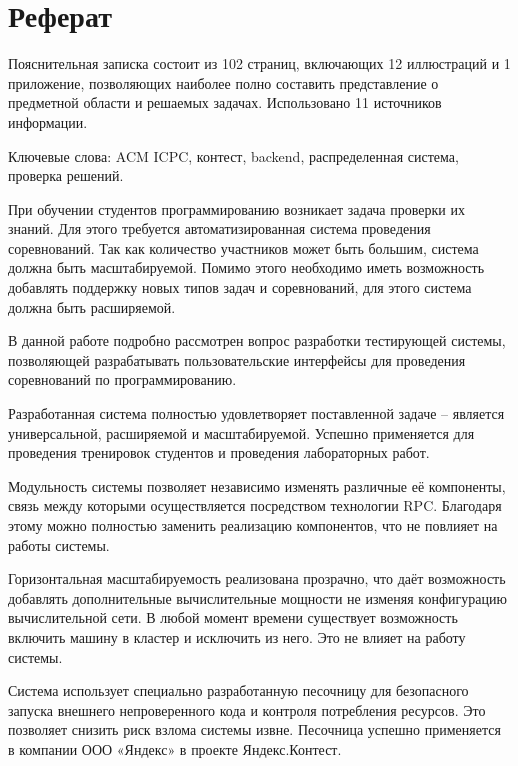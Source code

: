 \chapter*{Реферат}
Пояснительная записка состоит из
102 страниц, включающих 12 иллюстраций и 1 приложение,
позволяющих наиболее полно составить представление о предметной области и решаемых задачах.
Использовано 11 источников информации.

Ключевые слова: ACM ICPC, контест, backend, распределенная система, проверка решений.

При обучении студентов программированию возникает задача
проверки их знаний. Для этого требуется автоматизированная система
проведения соревнований. Так как количество участников
может быть большим, система должна быть масштабируемой.
Помимо этого необходимо иметь возможность добавлять поддержку
новых типов задач и соревнований, для этого
система должна быть расширяемой.


В данной работе подробно рассмотрен вопрос разработки тестирующей системы,
позволяющей разрабатывать пользовательские интерфейсы
для проведения соревнований по программированию.

Разработанная система полностью удовлетворяет поставленной задаче --
является универсальной, расширяемой и масштабируемой.
Успешно применяется для проведения тренировок студентов
и проведения лабораторных работ.

Модульность системы позволяет независимо изменять различные её компоненты,
связь между которыми осуществляется посредством технологии RPC.
Благодаря этому можно полностью заменить реализацию компонентов,
что не повлияет на работы системы.

Горизонтальная масштабируемость реализована прозрачно,
что даёт возможность добавлять дополнительные
вычислительные мощности не изменяя конфигурацию вычислительной сети.
В любой момент времени существует возможность включить машину в кластер
и исключить из него. Это не влияет на работу системы.

Система использует специально разработанную песочницу для
безопасного запуска внешнего непроверенного кода и контроля потребления ресурсов.
Это позволяет снизить риск взлома системы извне.
Песочница успешно применяется в компании ООО «Яндекс» в проекте Яндекс.Контест.

